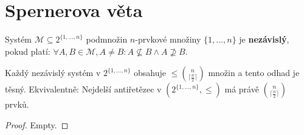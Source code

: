 \section{Spernerova věta}

\begin{definice}
	Systém $\mathcal{M} \subseteq 2^{ \{ 1, \dots , n \} }$ podmnožin $n$-prvkové množiny $\{ 1, \dots , n \}$ je \textbf{nezávislý}, pokud platí: $\forall A, B \in \mathcal{M}, A \neq B: A \nsubseteq B \land A \nsupseteq B$.
\end{definice}

\begin{veta}
	Každý nezávislý systém v $2^{ \{ 1, \dots , n \} }$ obsahuje $\leq \binom{n}{\lceil \frac{n}{2}\rceil}$ množin a tento odhad je těsný. Ekvivalentně: Nejdelší antiřetězec v $(2^{ \{ 1, \dots , n \} }, \leq)$ má právě $\binom{n}{\lceil \frac{n}{2}\rceil}$ prvků.
\end{veta}

\begin{proof}
	Empty.
\end{proof}
